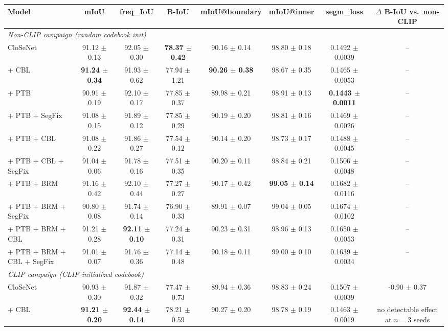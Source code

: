 \begin{tabular}{lccccccc}
\toprule
Model & mIoU & freq\_IoU & B-IoU & mIoU@boundary & mIoU@inner & segm\_loss & $\Delta$ B-IoU vs.\ non-CLIP \\
\midrule
\multicolumn{8}{l}{\textit{Non-CLIP campaign (random codebook init)}} \\
\midrule
CloSeNet & 91.12 $\pm$ 0.13 & 92.05 $\pm$ 0.30 & \textbf{78.37 $\pm$ 0.42} & 90.16 $\pm$ 0.14 & 98.80 $\pm$ 0.18 & 0.1492 $\pm$ 0.0039 & -- \\
+ CBL & \textbf{91.24 $\pm$ 0.34} & 91.93 $\pm$ 0.62 & 77.94 $\pm$ 1.21 & \textbf{90.26 $\pm$ 0.38} & 98.67 $\pm$ 0.35 & 0.1465 $\pm$ 0.0053 & -- \\
+ PTB & 90.91 $\pm$ 0.19 & 92.10 $\pm$ 0.17 & 77.85 $\pm$ 0.37 & 89.98 $\pm$ 0.21 & 98.91 $\pm$ 0.13 & \textbf{0.1443 $\pm$ 0.0011} & -- \\
+ PTB + SegFix & 91.08 $\pm$ 0.15 & 91.89 $\pm$ 0.12 & 77.85 $\pm$ 0.29 & 90.19 $\pm$ 0.20 & 98.81 $\pm$ 0.16 & 0.1469 $\pm$ 0.0026 & -- \\
+ PTB + CBL & 91.08 $\pm$ 0.22 & 91.86 $\pm$ 0.27 & 77.54 $\pm$ 0.12 & 90.14 $\pm$ 0.20 & 98.73 $\pm$ 0.17 & 0.1488 $\pm$ 0.0045 & -- \\
+ PTB + CBL + SegFix & 91.04 $\pm$ 0.06 & 91.78 $\pm$ 0.16 & 77.51 $\pm$ 0.35 & 90.20 $\pm$ 0.11 & 98.84 $\pm$ 0.21 & 0.1506 $\pm$ 0.0048 & -- \\
+ PTB + BRM & 91.16 $\pm$ 0.42 & 92.10 $\pm$ 0.44 & 77.27 $\pm$ 0.27 & 90.17 $\pm$ 0.42 & \textbf{99.05 $\pm$ 0.14} & 0.1682 $\pm$ 0.0116 & -- \\
+ PTB + BRM + SegFix & 90.80 $\pm$ 0.08 & 91.74 $\pm$ 0.14 & 76.90 $\pm$ 0.33 & 89.91 $\pm$ 0.07 & 99.04 $\pm$ 0.05 & 0.1674 $\pm$ 0.0102 & -- \\
+ PTB + BRM + CBL & 91.21 $\pm$ 0.28 & \textbf{92.11 $\pm$ 0.10} & 77.24 $\pm$ 0.31 & 90.23 $\pm$ 0.31 & 98.96 $\pm$ 0.13 & 0.1650 $\pm$ 0.0053 & -- \\
+ PTB + BRM + CBL + SegFix & 91.01 $\pm$ 0.07 & 91.76 $\pm$ 0.36 & 77.14 $\pm$ 0.48 & 90.18 $\pm$ 0.11 & 99.00 $\pm$ 0.10 & 0.1639 $\pm$ 0.0034 & -- \\
\midrule
\multicolumn{8}{l}{\textit{CLIP campaign (CLIP-initialized codebook)}} \\
\midrule
CloSeNet & 90.93 $\pm$ 0.30 & 91.87 $\pm$ 0.32 & 77.47 $\pm$ 0.73 & 89.94 $\pm$ 0.36 & 98.83 $\pm$ 0.24 & 0.1507 $\pm$ 0.0039 & -0.90 $\pm$ 0.37 \\
+ CBL & \textbf{91.21 $\pm$ 0.20} & \textbf{92.44 $\pm$ 0.14} & 78.21 $\pm$ 0.59 & 90.27 $\pm$ 0.20 & 98.78 $\pm$ 0.19 & 0.1463 $\pm$ 0.0019 & no detectable effect at $n{=}3$ seeds \\

\end{tabular}
